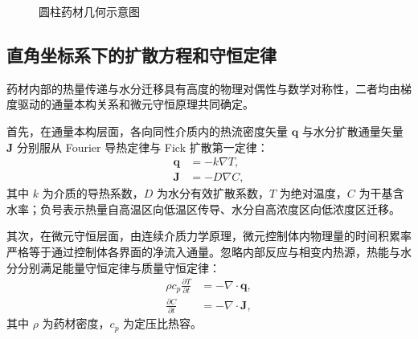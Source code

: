 \documentclass[12pt,a4paper]{ctexart}
\begin{document}
\begin{figure}[H]
\centering
{}
\caption{圆柱药材几何示意图}\label{fig:cylinder}
\end{figure}

\subsection{直角坐标系下的扩散方程和守恒定律}
药材内部的热量传递与水分迁移具有高度的物理对偶性与数学对称性，二者均由梯度驱动的通量本构关系和微元守恒原理共同确定。

首先，在通量本构层面，各向同性介质内的热流密度矢量 $\mathbf{q}$ 与水分扩散通量矢量 $\mathbf{J}$ 分别服从 Fourier 导热定律与 Fick 扩散第一定律：
\begin{align}
\mathbf{q} &= -k\nabla T,\label{eq:fourier}\\
\mathbf{J} &= -D\nabla C,\label{eq:fick}
\end{align}
其中 $k$ 为介质的导热系数，$D$ 为水分有效扩散系数，$T$ 为绝对温度，$C$ 为干基含水率；负号表示热量自高温区向低温区传导、水分自高浓度区向低浓度区迁移。

其次，在微元守恒层面，由连续介质力学原理，微元控制体内物理量的时间积累率严格等于通过控制体各界面的净流入通量。忽略内部反应与相变内热源，热能与水分分别满足能量守恒定律与质量守恒定律：
\begin{align}
\rho c_p\frac{\partial T}{\partial t} &= -\nabla\cdot\mathbf{q},\label{eq:cons_energy}\\
\frac{\partial C}{\partial t} &= -\nabla\cdot\mathbf{J},\label{eq:cons_mass}
\end{align}
其中 $\rho$ 为药材密度，$c_p$ 为定压比热容。
\end{document}
